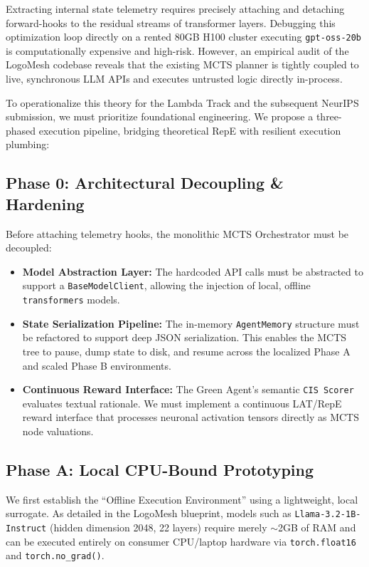 \documentclass[11pt, a4paper]{article}
\begin{document}
Extracting internal state telemetry requires precisely attaching and detaching forward-hooks to the residual streams of transformer layers. Debugging this optimization loop directly on a rented 80GB H100 cluster executing \texttt{gpt-oss-20b} is computationally expensive and high-risk. However, an empirical audit of the LogoMesh codebase reveals that the existing MCTS planner is tightly coupled to live, synchronous LLM APIs and executes untrusted logic directly in-process.

To operationalize this theory for the Lambda Track and the subsequent NeurIPS submission, we must prioritize foundational engineering. We propose a three-phased execution pipeline, bridging theoretical RepE with resilient execution plumbing:

\subsection{Phase 0: Architectural Decoupling \& Hardening}
Before attaching telemetry hooks, the monolithic MCTS Orchestrator must be decoupled:
\begin{sloppypar}
\begin{itemize}
    \item \textbf{Model Abstraction Layer:} The hardcoded  API calls must be abstracted to support a \texttt{BaseModelClient}, allowing the injection of local, offline \texttt{transformers} models.
    \item \textbf{State Serialization Pipeline:} The in-memory \texttt{AgentMemory} structure must be refactored to support deep JSON serialization. This enables the MCTS tree to pause, dump state to disk, and resume across the localized Phase A and scaled Phase B environments.
    \item \textbf{Continuous Reward Interface:} The Green Agent's semantic \texttt{CIS Scorer} evaluates textual rationale. We must implement a continuous LAT/RepE reward interface that processes neuronal activation tensors directly as MCTS node valuations.
\end{itemize}
\end{sloppypar}

\subsection{Phase A: Local CPU-Bound Prototyping}
We first establish the ``Offline Execution Environment'' using a lightweight, local surrogate. As detailed in the LogoMesh blueprint, models such as \texttt{Llama-3.2-1B-Instruct} (hidden dimension 2048, 22 layers) require merely $\sim$2GB of RAM and can be executed entirely on consumer CPU/laptop hardware via \texttt{torch.float16} and \texttt{torch.no\_grad()}. 
\end{document}
